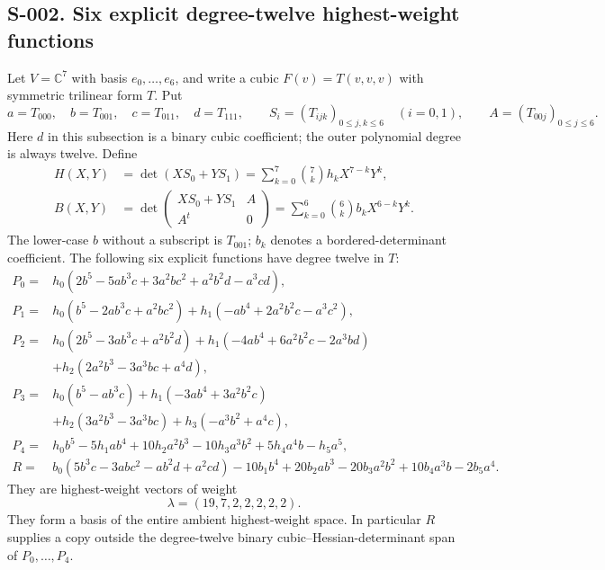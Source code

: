 \subsection{S-002. Six explicit degree-twelve highest-weight functions}
Let $V=\mathbb C^7$ with basis $e_0,\ldots,e_6$, and write a cubic
$F(v)=T(v,v,v)$ with symmetric trilinear form $T$. Put
\[
 a=T_{000},\quad b=T_{001},\quad c=T_{011},\quad d=T_{111},
 \qquad S_i=(T_{ijk})_{0\leq j,k\leq6}\quad(i=0,1),
 \qquad A=(T_{00j})_{0\leq j\leq6}.
\]
Here $d$ in this subsection is a binary cubic coefficient; the outer
polynomial degree is always twelve. Define
\[
 \begin{split}
 H(X,Y)&=\det(XS_0+YS_1)
       =\sum_{k=0}^7\binom7k h_kX^{7-k}Y^k,\\
 B(X,Y)&=\det\begin{pmatrix}XS_0+YS_1&A\\A^t&0\end{pmatrix}
       =\sum_{k=0}^6\binom6k b_kX^{6-k}Y^k.
 \end{split}
\]
The lower-case $b$ without a subscript is $T_{001}$; $b_k$ denotes a
bordered-determinant coefficient. The following six explicit functions
have degree twelve in $T$:
\[
\begin{aligned}
 P_0={}&h_0(2b^5-5ab^3c+3a^2bc^2+a^2b^2d-a^3cd),\\
 P_1={}&h_0(b^5-2ab^3c+a^2bc^2)
        +h_1(-ab^4+2a^2b^2c-a^3c^2),\\
 P_2={}&h_0(2b^5-3ab^3c+a^2b^2d)
        +h_1(-4ab^4+6a^2b^2c-2a^3bd)\\
       &+h_2(2a^2b^3-3a^3bc+a^4d),\\
 P_3={}&h_0(b^5-ab^3c)+h_1(-3ab^4+3a^2b^2c)\\
       &+h_2(3a^2b^3-3a^3bc)+h_3(-a^3b^2+a^4c),\\
 P_4={}&h_0b^5-5h_1ab^4+10h_2a^2b^3-10h_3a^3b^2
        +5h_4a^4b-h_5a^5,\\
 R={}&b_0(5b^3c-3abc^2-ab^2d+a^2cd)-10b_1b^4
       +20b_2ab^3-20b_3a^2b^2+10b_4a^3b-2b_5a^4.
\end{aligned}
\]
They are highest-weight vectors of weight
\[
                         \lambda=(19,7,2,2,2,2,2).
\]
They form a basis of the entire ambient highest-weight space. In
particular $R$ supplies a copy outside the degree-twelve binary
cubic--Hessian-determinant span of $P_0,\ldots,P_4$.

